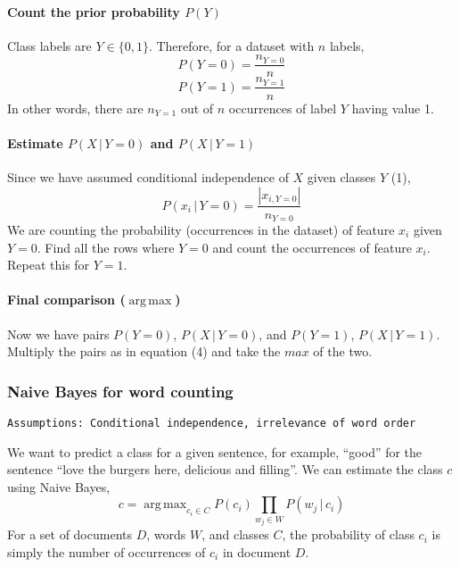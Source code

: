 \documentclass[9pt,twocolumn]{article}
\DeclareMathOperator*{\argmax}{arg\,max}
\begin{document}
\paragraph*{Count the prior probability $P(Y)$}
Class labels are $Y\in\{0,1\}$. Therefore, for a dataset with $n$ labels,
\begin{equation}
	P(Y=0) = \frac{n_{Y=0}}{n}
\end{equation}
\begin{equation}
	P(Y=1) = \frac{n_{Y=1}}{n}
\end{equation}
In other words, there are $n_{Y=1}$ out of $n$ occurrences of label $Y$ having value 1.
\paragraph*{Estimate $P(X\,|\,Y=0)$ and $P(X\,|\,Y=1)$}
Since we have assumed conditional independence of $X$ given classes $Y$ (1),
\begin{equation}
	P(x_i\,|\,Y=0) = \frac{|x_{i,Y=0}|}{n_{Y=0}}
\end{equation}
We are counting the probability (occurrences in the dataset) of feature $x_i$ given $Y=0$. Find all the rows where $Y=0$ and count the occurrences of feature $x_i$. Repeat this for $Y=1$.

\paragraph*{Final comparison ($\argmax$)}
Now we have pairs $P(Y=0)$, $P(X\,|\,Y=0)$, and $P(Y=1)$, $P(X\,|\,Y=1)$. Multiply the pairs as in equation (4)	and take the $max$ of the two.

\subsubsection*{Naive Bayes for word counting}
\begin{lstlisting}
Assumptions: Conditional independence, irrelevance of word order
\end{lstlisting}
We want to predict a class for a given sentence, for example, ``good'' for the sentence ``love the burgers here, delicious and filling''. We can estimate the class $c$ using Naive Bayes,
\begin{equation}
	c = \argmax	_{c_i\in C} P(c_i) \prod_{w_j\in W} P(w_j\,|\,c_i)
\end{equation}
For a set of documents $D$, words $W$, and classes $C$, the probability of class $c_i$ is simply the number of occurrences of $c_i$ in document $D$.
\end{document}
